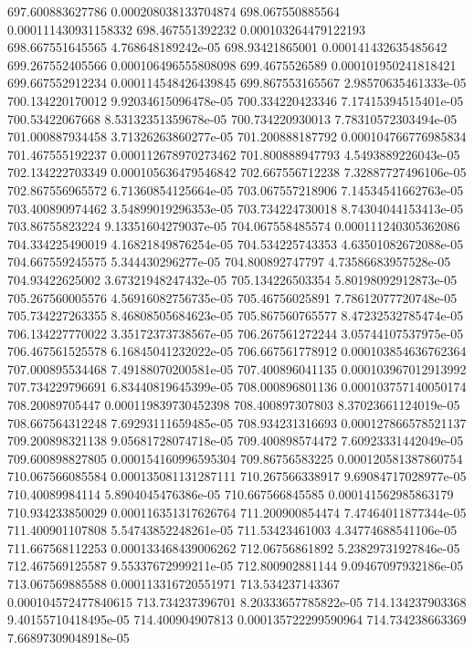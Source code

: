 {697.600883627786 0.000208038133704874
698.067550885564 0.000111430931158332
698.467551392232 0.000103264479122193
698.667551645565 4.768648189242e-05
698.93421865001 0.000141432635485642
699.267552405566 0.000106496555808098
699.4675526589 0.000101950241818421
699.667552912234 0.000114548426439845
699.867553165567 2.98570635461333e-05
700.134220170012 9.92034615096478e-05
700.334220423346 7.17415394515401e-05
700.53422067668 8.53132351359678e-05
700.734220930013 7.78310572303494e-05
701.000887934458 3.71326263860277e-05
701.200888187792 0.000104766776985834
701.467555192237 0.000112678970273462
701.800888947793 4.5493889226043e-05
702.134222703349 0.000105636479546842
702.667556712238 7.32887727496106e-05
702.867556965572 6.71360854125664e-05
703.067557218906 7.14534541662763e-05
703.400890974462 3.54899019296353e-05
703.734224730018 8.74304044153413e-05
703.86755823224 9.13351604279037e-05
704.067558485574 0.000111240305362086
704.334225490019 4.16821849876254e-05
704.534225743353 4.63501082672088e-05
704.667559245575 5.344430296277e-05
704.800892747797 4.73586683957528e-05
704.93422625002 3.67321948247432e-05
705.134226503354 5.80198092912873e-05
705.267560005576 4.56916082756735e-05
705.46756025891 7.78612077720748e-05
705.734227263355 8.46808505684623e-05
705.867560765577 8.47232532785474e-05
706.134227770022 3.35172373738567e-05
706.267561272244 3.05744107537975e-05
706.467561525578 6.16845041232022e-05
706.667561778912 0.000103854636762364
707.000895534468 7.49188070200581e-05
707.400896041135 0.000103967012913992
707.734229796691 6.83440819645399e-05
708.000896801136 0.000103757140050174
708.20089705447 0.000119839730452398
708.400897307803 8.37023661124019e-05
708.667564312248 7.69293111659485e-05
708.934231316693 0.000127866578521137
709.200898321138 9.05681728074718e-05
709.400898574472 7.60923331442049e-05
709.600898827805 0.000154160996595304
709.86756583225 0.000120581387860754
710.067566085584 0.000135081131287111
710.267566338917 9.69084717028977e-05
710.40089984114 5.8904045476386e-05
710.667566845585 0.000141562985863179
710.934233850029 0.000116351317626764
711.200900854474 7.47464011877344e-05
711.400901107808 5.54743852248261e-05
711.53423461003 4.34774688541106e-05
711.667568112253 0.000133468439006262
712.06756861892 5.23829731927846e-05
712.467569125587 9.55337672999211e-05
712.800902881144 9.09467097932186e-05
713.067569885588 0.000113316720551971
713.534237143367 0.000104572477840615
713.734237396701 8.20333657785822e-05
714.134237903368 9.40155710418495e-05
714.400904907813 0.000135722299590964
714.734238663369 7.66897309048918e-05
}

